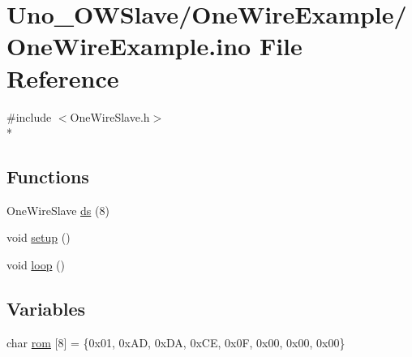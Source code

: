 \hypertarget{OneWireExample_8ino}{\section{Uno\-\_\-\-O\-W\-Slave/\-One\-Wire\-Example/\-One\-Wire\-Example.ino File Reference}
\label{OneWireExample_8ino}
}
{\ttfamily \#include $<$One\-Wire\-Slave.\-h$>$}\\*
\subsection*{Functions}
\begin{DoxyCompactItemize}
\item 
One\-Wire\-Slave \hyperlink{OneWireExample_8ino_aa1732f101d17b2e69504adcb7251e605}{ds} (8)
\item 
void \hyperlink{OneWireExample_8ino_a4fc01d736fe50cf5b977f755b675f11d}{setup} ()
\item 
void \hyperlink{OneWireExample_8ino_afe461d27b9c48d5921c00d521181f12f}{loop} ()
\end{DoxyCompactItemize}
\subsection*{Variables}
\begin{DoxyCompactItemize}
\item 
char \hyperlink{OneWireExample_8ino_a7356d527a8784ed9c916858507b1f7d3}{rom} \mbox{[}8\mbox{]} = \{0x01, 0x\-A\-D, 0x\-D\-A, 0x\-C\-E, 0x0\-F, 0x00, 0x00, 0x00\}
\end{DoxyCompactItemize}


